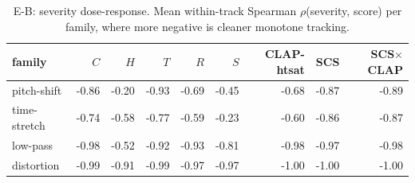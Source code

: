 \begin{table}[t]
\centering
\caption[Severity dose-response by family]{E-B: severity dose-response. Mean within-track Spearman $\rho$(severity, score) per family, where more negative is cleaner monotone tracking.}
\label{tab:dose}
\begin{tabular}{lrrrrrrrr}
\toprule
family & $C$ & $H$ & $T$ & $R$ & $S$ & CLAP-htsat & SCS & SCS$\times$CLAP \\
\midrule
pitch-shift & -0.86 & -0.20 & -0.93 & -0.69 & -0.45 & -0.68 & -0.87 & -0.89 \\
time-stretch & -0.74 & -0.58 & -0.77 & -0.59 & -0.23 & -0.60 & -0.86 & -0.87 \\
low-pass & -0.98 & -0.52 & -0.92 & -0.93 & -0.81 & -0.98 & -0.97 & -0.98 \\
distortion & -0.99 & -0.91 & -0.99 & -0.97 & -0.97 & -1.00 & -1.00 & -1.00 \\
\bottomrule
\end{tabular}
\end{table}
